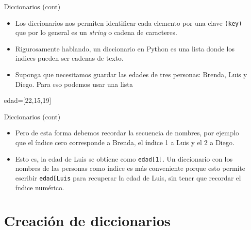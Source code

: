 \documentclass[
  ignorenonframetext,
  aspectratio=169,
  spanish,
]{beamer}
\newenvironment{Shaded}{\begin{snugshade}}{\end{snugshade}}
\newcommand{\DecValTok}[1]{\textcolor[rgb]{0.68,0.00,0.00}{#1}}
\newcommand{\NormalTok}[1]{\textcolor[rgb]{0.00,0.23,0.31}{#1}}
\newcommand{\OperatorTok}[1]{\textcolor[rgb]{0.37,0.37,0.37}{#1}}
\begin{document}
\begin{frame}[fragile]{Diccionarios (cont)}
\label{diccionarios-cont}
\begin{itemize}
\item
  Los diccionarios nos permiten identificar cada elemento por una clave
  \texttt{(key)} que por lo general es un \emph{string} o cadena de
  caracteres.
\item
  Rigurosamente hablando, un diccionario en Python es una lista donde
  los índices pueden ser cadenas de texto.
\item
  Suponga que necesitamos guardar las edades de tres personas: Brenda,
  Luis y Diego. Para eso podemos usar una lista
\end{itemize}

\begin{Shaded}
\begin{Highlighting}[]
\NormalTok{edad}\OperatorTok{=}\NormalTok{[}\DecValTok{22}\NormalTok{,}\DecValTok{15}\NormalTok{,}\DecValTok{19}\NormalTok{]  }
\end{Highlighting}
\end{Shaded}
\end{frame}

\begin{frame}[fragile]{Diccionarios (cont)}
\label{diccionarios-cont-1}
\begin{itemize}
\item
  Pero de esta forma debemos recordar la secuencia de nombres, por
  ejemplo que el índice cero corresponde a Brenda, el índice 1 a Luis y
  el 2 a Diego.
\item
  Esto es, la edad de Luis se obtiene como \texttt{edad{[}1{]}}. Un
  diccionario con los nombres de las personas como índice es más
  conveniente porque esto permite escribir
  \texttt{edad{[}\textquotesingle{}Luis\textquotesingle{}{]}} para
  recuperar la edad de Luis, sin tener que recordar el índice numérico.
\end{itemize}
\end{frame}

\section{Creación de diccionarios}\label{creaciuxf3n-de-diccionarios}
\end{document}
